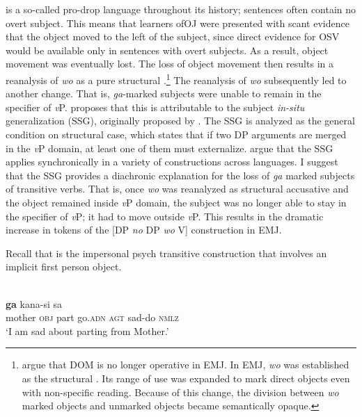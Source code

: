 \documentclass[output=paper]{LSP/langsci}
\begin{document}
 is a so-called pro-drop language throughout its history; sentences often contain no overt subject. This means that learners ofOJ  were presented with scant evidence that the object moved to the left of the subject, since direct evidence for OSV would be available only in sentences with overt subjects. As a result, object movement was eventually lost. 
The loss of object movement then results in a reanalysis of \textit{wo} as a pure structural .\footnote{ 
argue that DOM is no longer operative in EMJ. In EMJ, \textit{wo} was established as the structural . Its range of use was expanded to mark direct objects even with non-specific reading. Because of this change, the division between \textit{wo} marked objects and unmarked objects became semantically opaque.} The reanalysis of \textit{wo} subsequently led to another change. That is, \textit{ga}-marked subjects were unable to remain in the specifier of \textit{v}P. \citet{YanigadaDifferential} proposes that this is attributable to the subject \textit{in-situ} generalization (SSG), originally proposed by \citet{Alexiadouetal2001Subject-in-situ}. The SSG is analyzed as the general condition on structural case, which states that if two DP arguments are merged in the \textit{v}P domain, at least one of them must externalize. \citet{Alexiadouetal2001Subject-in-situ} argue that the SSG applies synchronically in a variety of constructions across languages. I suggest that the SSG provides a diachronic explanation for the loss of \textit{ga} marked subjects of transitive verbs. That is, once \textit{wo} was reanalyzed as structural accusative and the object remained inside \textit{v}P domain, the subject was no longer able to stay in the specifier of \textit{v}P; it had to move outside \textit{v}P. This results in the dramatic increase in tokens of the [DP \textit{no} DP \textit{wo} V] construction  in EMJ.

Recall that  is the impersonal psych transitive construction that involves an implicit first person  object.

\begin{exe}
\ex%
\label{14-ya-ex:26}
\\
 \textbf{ga} kana-si sa\\ %
mother \textsc{obj} part go.\textsc{adn} \textsc{agt} sad-do \textsc{nmlz}\\
\glt ‘I am sad about parting from Mother.’
\end{exe}
\end{document}
